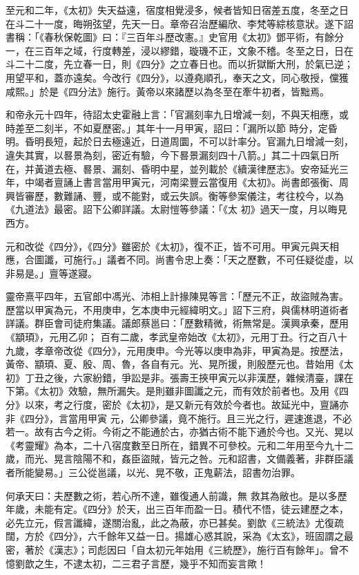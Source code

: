 \begin{pinyinscope}
 至元和二年，《太初》失天益遠，宿度相覺浸多，候者皆知日宿差五度，冬至之日在斗二十一度，晦朔弦望，先天一日。章帝召治歷編欣、李梵等綜核意狀。遂下詔書稱：「《春秋保乾圖》曰：『三百年斗歷改憲。』史官用《太初》鄧平術，有餘分
 一，在三百年之域，行度轉差，浸以繆錯，璇璣不正，文象不稽。冬至之日，日在斗二十二度，先立春一日，則《四分》之立春日也。而以折獄斷大刑，於氣已逆；用望平和，蓋亦遠矣。今改行《四分》，以遵堯順孔，奉天之文，同心敬授，儻獲咸熙。」於是《四分法》施行。黃帝以來諸歷以為冬至在牽牛初者，皆黜焉。



 和帝永元十四年，待詔太史霍融上言：「官漏刻率九日增減一刻，不與天相應，或時差至二刻半，不如夏歷密。」其年十一月甲寅，詔曰：「漏所以節
 時分，定昏明。昏明長短，起於日去極遠近，日道周圜，不可以計率分。官漏九日增減一刻，違失其實，以晷景為刻，密近有驗，今下晷景漏刻四十八箭。」其二十四氣日所在，并黃道去極、晷景、漏刻、昏明中星，並列載於《續漢律歷志》。安帝延光三年，中竭者亶誦上書言當用甲寅元，河南梁豐云當復用《太初》。尚書郎張衡、周興皆審歷，數難誦、豐，或不能對，或云失誤。衡等參案儀注，考往校今，以為《九道法》最密。詔下公卿詳議。太尉愷等參議：「《太
 初》過天一度，月以晦見西方。



 元和改從《四分》，《四分》雖密於《太初》，復不正，皆不可用。甲寅元與天相應，合圖讖，可施行。」議者不同。尚書令忠上奏：「天之歷數，不可任疑從虛，以非易是。」亶等遂寢。



 靈帝熹平四年，五官郎中馮光、沛相上計掾陳晃等言：「歷元不正，故盜賊為害。歷當以甲寅為元，不用庚申，乞本庚申元經緯明文。」詔下三府，與儒林明道術者詳議。群臣會司徒府集議。議郎蔡邕曰：「歷數精微，術無常是。漢興承秦，歷用《顓頊》，元用乙卯；
 百有二歲，孝武皇帝始改《太初》，元用丁丑。行之百八十九歲，孝章帝改從《四分》，元用庚申。今光等以庚申為非，甲寅為是。按歷法，黃帝、顓頊、夏、殷、周、魯，各自有元。光、晃所援，則殷歷元也。昔始用《太初》丁丑之後，六家紛錯，爭訟是非。張壽王挾甲寅元以非漢歷，雜候清臺，課在下第。《太初》效驗，無所漏失。是則雖非圖讖之元，而有效於前者也。及用《四分》以來，考之行度，密於《太初》，是又新元有效於今者也。故延光中，亶誦亦非《四分》，言當用甲寅
 元，公卿參議，竟不施行。且三光之行，遲速進退，不必若一。故有古今之術。今術之不能通於古，亦猶古術不能下通於今也。又光、晃以《考靈耀》為本，二十八宿度數至日所在，錯異不可參校。元和二年用至今九十二歲，而光、晃言陰陽不和，姦臣盜賊，皆元之咎。元和詔書，文備義著，非群臣議者所能變易。」三公從邕議，以光、晃不敬，正鬼薪法，詔書勿治罪。



 何承天曰：夫歷數之術，若心所不達，雖復通人前識，無
 救其為敝也。是以多歷年歲，未能有定。《四分》於天，出三百年而盈一日。積代不悟，徒云建歷之本，必先立元，假言讖緯，遂關治亂，此之為蔽，亦已甚矣。劉歆《三統法》尤復疏闊，方於《四分》，六千餘年又益一日。揚雄心惑其說，采為《太玄》，班固謂之最密，著於《漢志》；司彪因曰「自太初元年始用《三統歷》，施行百有餘年」。曾不憶劉歆之生，不逮太初，二三君子言歷，幾乎不知而妄言歟！




\end{pinyinscope}

